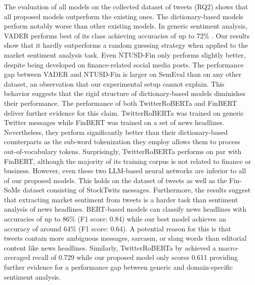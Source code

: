 The evaluation of all models on the collected dataset of tweets (RQ2) shows that all proposed models outperform the existing ones. The dictionary-based models perform notably worse than other existing models. In generic sentiment analysis, VADER performs best of its class achieving accuracies of up to 72\% . Our results show that it hardly outperforms a random guessing strategy when applied to the market sentiment analysis task. Even NTUSD-Fin only performs slightly better, despite being developed on finance-related social media posts. The performance gap between VADER and NTUSD-Fin is larger on SemEval than on any other dataset, an observation that our experimental setup cannot explain.
 This behavior suggests that the rigid structure of dictionary-based models diminishes their performance. The performance of both TwitterRoBERTa and FinBERT deliver further evidence for this claim. TwitterRoBERTa was trained on generic Twitter messages while FinBERT was trained on a set of news headlines. Nevertheless, they perform significantly better than their dictionary-based counterparts as the sub-word tokenization they employ allows them to process out-of-vocabulary tokens. Surprisingly, TwitterRoBERTa performs on par with FinBERT, although the majority of its training corpus is not related to finance or business. However, even these two LLM-based neural networks are inferior to all of our proposed models. This holds on the dataset of tweets as well as the Fin-SoMe dataset consisting of StockTwits messages.\newline
 Furthermore, the results suggest that extracting market sentiment from tweets is a harder task than sentiment analysis of news headlines. BERT-based models can classify news headlines with accuracies of up to 86\% (F1 score: 0.84)  while our best model achieves an accuracy of around 64\% (F1 score: 0.64). A potential reason for this is that tweets contain more ambiguous messages, sarcasm, or slang words than editorial content like news headlines. Similarly, TwitterRoBERTa by  achieved a macro-averaged recall of 0.729 while our proposed model only scores 0.611 providing further evidence for a performance gap between generic and domain-specific sentiment analysis.

